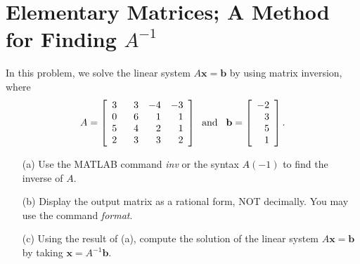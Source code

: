 \section{Elementary Matrices; A Method for Finding $A^{-1}$}



\begin{exer}

In this problem, we solve the linear system $A \mathbf{x} = \mathbf{b}$ by using matrix inversion, where
$$
A = \left[\begin{array}{rrrr} 3 &\hspace{2.5mm} 3 & -4 & -3 \\ 0 & 6 & 1 & 1\\ 5 & 4 & 2 & 1 \\ 2 & 3 & 3 & 2 \end{array} \right] \hspace{2mm} \mathrm{and} \hspace{3mm} \textbf{b} = \left[\begin{array}{r} -2 \\ 3 \\ 5 \\ 1 \end{array} \right].
$$

\begin{enumerate}
\item[(a)] Use the MATLAB command \textit{inv} or the syntax $A$\hspace{1mm}$\hat{}$\hspace{1mm}$(-1)$ to find the inverse of $A$.
\vspace{1mm}
\item[(b)] Display the output matrix as a rational form, NOT decimally. You may use the command \textit{format}.
\vspace{1mm}
\item[(c)] Using the result of (a), compute the solution of the linear system $A \mathbf{x} = \mathbf{b}$ by taking $\mathbf{x} = A^{-1} \mathbf{b}$.

\end{enumerate}

\end{exer}


